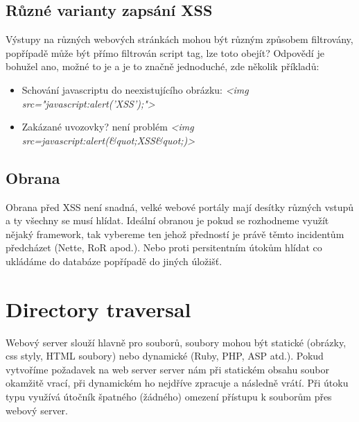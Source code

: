 \documentclass[12pt, a4paper]{report}
\begin{document}
\subsection{Různé varianty zapsání XSS}
Výstupy na různých webových stránkách mohou být různým způsobem filtrovány, popřípadě může být přímo filtrován script tag, lze toto obejít? Odpovědí je bohužel ano, možné to je a je to značně jednoduché, zde několik příkladů:

\begin{itemize}
\item Schování javascriptu do neexistujícího obrázku: \textit{<img src="javascript:alert('XSS');">}
\item Zakázané uvozovky? není problém \textit{<img src=javascript:alert(\&quot;XSS\&quot;)>}
\end{itemize}

\subsection{Obrana}
Obrana před XSS není snadná, velké webové portály mají desítky různých vstupů a ty všechny se musí hlídat. Ideální obranou je pokud se rozhodneme využít nějaký framework, tak vybereme ten jehož předností je právě těmto incidentům předcházet (Nette, RoR apod.). Nebo proti persitentním útokům hlídat co ukládáme do databáze popřípadě do jiných úložišť.


\section{Directory traversal}
Webový server slouží hlavně pro  souborů, soubory mohou být statické (obrázky, css styly, HTML soubory) nebo dynamické (Ruby, PHP, ASP atd.). Pokud vytvoříme požadavek na web server server nám při statickém obsahu soubor okamžitě vrací, při dynamickém ho nejdříve zpracuje a následně vrátí. Při útoku typu  využívá útočník špatného (žádného) omezení přístupu k souborům přes webový server.
\end{document}
